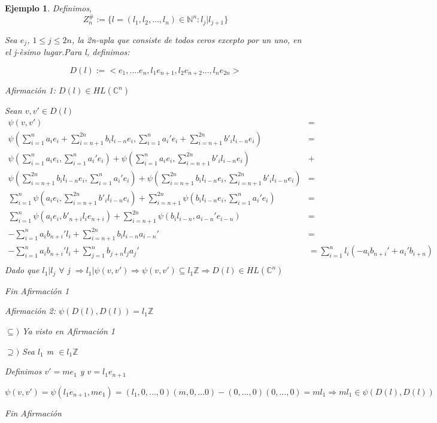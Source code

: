 \documentclass[12pt]{article}
\newtheorem{example}{Ejemplo}
\begin{document}
\begin{example} 
 Definimos,
 $$Z_n^{\#}:= \{ l=(l_1,l_2,...,l_n) \in \mathbb{N}^n:l_j|l_{j+1} \}$$
 
 Sea $e_j$, $1\leq j \leq 2n $,  la 2n-upla que consiste de todos ceros excepto por un uno, en el j-èsimo lugar.Para l, definimos:
 
 $$D(l):=<e_1,....e_n,l_1 e_{n+1},l_2 e_{n+2}...,l_n e_{2n}>$$
  \newpage
 
 Afirmación 1: $D(l) \in HL(\mathbb{C}^n)$ 
 
 Sean $v,v' \in D(l)$
  $$\begin{aligned}
  \psi(v,v')&= \\
  \psi(\sum_{i=1}^n a_i e_i + \sum_{i=n+1}^{2n}b_i l_{i-n} e_i, \sum_{i=1}^n a_i' e_i + \sum_{i=n+1}^{2n}b'_i l_{i-n}e_i )&=\\
  \psi(\sum_{i=1}^n a_i e_i , \sum_{i=1}^n a_i' e_i ) + \psi(\sum_{i=1}^n a_i e_i , \sum_{i=n+1}^{2n}b'_i l_{i-n} e_i)  & + \\
  \psi( \sum_{i=n+1}^{2n}b_i l_{i-n}e_i, \sum_{i=1}^n a_i' e_i ) + \psi(\sum_{i=n+1}^{2n}b_i l_{i-n}e_i, \sum_{i=n+1}^{2n}b'_i l_{i-n}e_i)&=\\
   \sum_{i=1}^n \psi( a_i e_i , \sum_{i=n+1}^{2n}b'_i l_{i-n}e_i) + \sum_{i=n+1}^{2n}\psi( b_i l_{i-n}e_i, \sum_{i=1}^n a_i' e_i )&=\\
   \sum_{i=1}^n \psi( a_i e_i , b'_{n+i} l_{i} e_{n+i}) + \sum_{i=n+1}^{2n}\psi( b_i l_{i-n}, a_{i-n}' e_{i-n} )&=\\
   -\sum_{i=1}^n a_i b_{n+i}' l_i + \sum_{i=n+1}^{2n} b_i l_{i-n}a_{i-n}'&=\\
   -\sum_{i=1}^n a_i b_{n+i}' l_i + \sum_{j=1}^{n} b_{j+n} l_{j}a_{j}' &=\sum_{i=1}^{n} l_i(-a_i b_{n+i}' + a_i' b_{i+n})\\
  \end{aligned}$$ 
   Dado que $l_1|l_j$ $\forall$ j $\Rightarrow l_1| \psi(v,v') \Rightarrow \psi(v,v') \subseteq l_1 \mathbb{Z} \Rightarrow 
   D(l) \in HL(\mathbb{C}^n)$
   
 Fin Afirmación 1
 \newline
 
 Afirmación 2: $\psi(D(l),D(l))=l_1 \mathbb{Z}$
 
 $\subseteq )$ Ya visto en Afirmación 1
 
 $\supseteq )$ Sea $l_1$ m $\in l_1 \mathbb{Z}$
 
 Definimos $v'=m e_1$ y  $v=l_1 e_{n+1}$
 
 $\psi(v,v') = \psi(l_1 e_{n+1},m e_1)= (l_1,0,...,0) (m,0,...0) - (0,...,0) (0,...,0)=m l_1 \Rightarrow m l_1 \in \psi(D(l),D(l))$
 
 Fin Afirmación  
  
\end{example}
\end{document}
